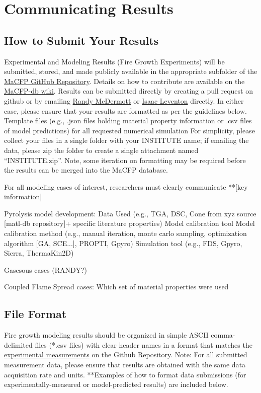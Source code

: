 \documentclass[12pt]{article}
\begin{document}
\clearpage
\section{Communicating Results}
\subsection{How to Submit Your Results}
Experimental and Modeling Results (Fire Growth Experiments) will be submitted, stored, and made publicly available in the appropriate subfolder of the \href{https://github.com/MaCFP/}{MaCFP GitHub Repository}. Details on how to contribute are available on the \href{https://github.com/MaCFP/macfp-db/wiki/How-to-Contribute}{MaCFP-db wiki}. Results can be submitted directly by creating a pull request on github or by emailing \href{mailto:randy.mcdermott@gmail.com}{Randy McDermott} or \href{mailto:isaac.leventon@gmail.com}{Isaac Leventon} directly. In either case, please ensure that your results are formatted as per the guidelines below. Template files (e.g., .json files holding material property information or .csv files of model predictions) for all requested numerical simulation For simplicity, please collect your files in a single folder with your INSTITUTE name; if emailing the data, please zip the folder to create a single attachment named “INSTITUTE.zip”. Note, some iteration on formatting may be required before the results can be merged into the MaCFP database.

For all modeling cases of interest, researchers must clearly communicate **[key information]

Pyrolysis model development:
Data Used (e.g., TGA, DSC, Cone from xyz source [matl-db repository]+ specific literature properties)
Model calibration tool
Model calibration method (e.g., manual iteration, monte carlo sampling, optimization algorithm [GA, SCE...], PROPTI, Gpyro)
Simulation tool (e.g., FDS, Gpyro, Sierra, ThermaKin2D)

Gasesous cases (RANDY?)

Coupled Flame Spread cases:
Which set of material properties were used

\subsection{File Format}
Fire growth modeling results should be organized in simple ASCII comma-delimited files (*.csv files) with clear header names in a format that matches the \href{https://github.com/MaCFP/macfp-db/tree/master/Fire_Growth}{experimental measurements} on the Github Repository. Note: For all submitted measurement data, please ensure that results are obtained with the same data acquisition rate and units. **Examples of how to format data submissions (for experimentally-measured or model-predicted results) are included below.
\end{document}
